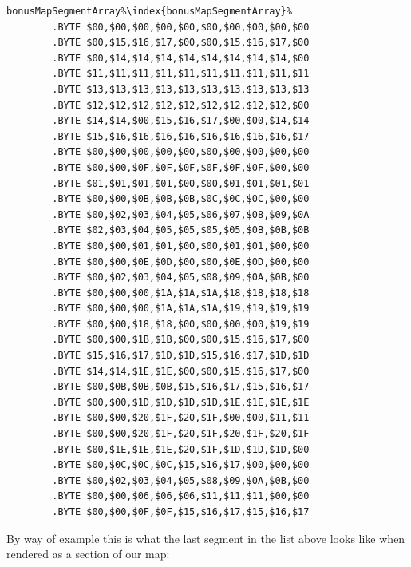 \begin{lstlisting}[escapechar=\%]
bonusMapSegmentArray%\index{bonusMapSegmentArray}%
        .BYTE $00,$00,$00,$00,$00,$00,$00,$00,$00,$00
        .BYTE $00,$15,$16,$17,$00,$00,$15,$16,$17,$00
        .BYTE $00,$14,$14,$14,$14,$14,$14,$14,$14,$00
        .BYTE $11,$11,$11,$11,$11,$11,$11,$11,$11,$11
        .BYTE $13,$13,$13,$13,$13,$13,$13,$13,$13,$13
        .BYTE $12,$12,$12,$12,$12,$12,$12,$12,$12,$00
        .BYTE $14,$14,$00,$15,$16,$17,$00,$00,$14,$14
        .BYTE $15,$16,$16,$16,$16,$16,$16,$16,$16,$17
        .BYTE $00,$00,$00,$00,$00,$00,$00,$00,$00,$00
        .BYTE $00,$00,$0F,$0F,$0F,$0F,$0F,$0F,$00,$00
        .BYTE $01,$01,$01,$01,$00,$00,$01,$01,$01,$01
        .BYTE $00,$00,$0B,$0B,$0B,$0C,$0C,$0C,$00,$00
        .BYTE $00,$02,$03,$04,$05,$06,$07,$08,$09,$0A
        .BYTE $02,$03,$04,$05,$05,$05,$05,$0B,$0B,$0B
        .BYTE $00,$00,$01,$01,$00,$00,$01,$01,$00,$00
        .BYTE $00,$00,$0E,$0D,$00,$00,$0E,$0D,$00,$00
        .BYTE $00,$02,$03,$04,$05,$08,$09,$0A,$0B,$00
        .BYTE $00,$00,$00,$1A,$1A,$1A,$18,$18,$18,$18
        .BYTE $00,$00,$00,$1A,$1A,$1A,$19,$19,$19,$19
        .BYTE $00,$00,$18,$18,$00,$00,$00,$00,$19,$19
        .BYTE $00,$00,$1B,$1B,$00,$00,$15,$16,$17,$00
        .BYTE $15,$16,$17,$1D,$1D,$15,$16,$17,$1D,$1D
        .BYTE $14,$14,$1E,$1E,$00,$00,$15,$16,$17,$00
        .BYTE $00,$0B,$0B,$0B,$15,$16,$17,$15,$16,$17
        .BYTE $00,$00,$1D,$1D,$1D,$1D,$1E,$1E,$1E,$1E
        .BYTE $00,$00,$20,$1F,$20,$1F,$00,$00,$11,$11
        .BYTE $00,$00,$20,$1F,$20,$1F,$20,$1F,$20,$1F
        .BYTE $00,$1E,$1E,$1E,$20,$1F,$1D,$1D,$1D,$00
        .BYTE $00,$0C,$0C,$0C,$15,$16,$17,$00,$00,$00
        .BYTE $00,$02,$03,$04,$05,$08,$09,$0A,$0B,$00
        .BYTE $00,$00,$06,$06,$06,$11,$11,$11,$00,$00
        .BYTE $00,$00,$0F,$0F,$15,$16,$17,$15,$16,$17
\end{lstlisting}

By way of example this is what the last segment in the list above looks like when 
rendered as a section of our map:

